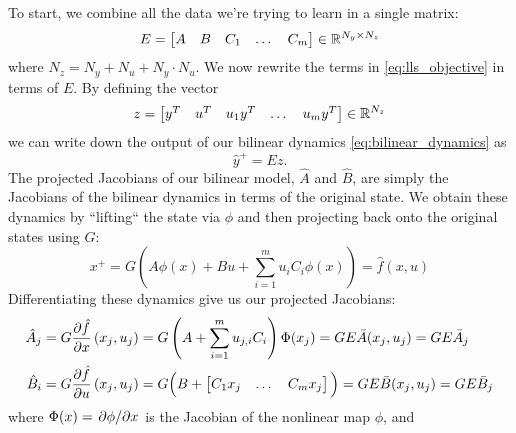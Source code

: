 \documentclass{article}
\begin{document}
  To start, we combine all the data we're trying to learn in a single matrix:
  \begin{equation}
      E = \begin{bmatrix} A & B & C_1 & \dots & C_m \end{bmatrix} \in \mathbb{R}^{N_y \times N_z} \\
  \end{equation}
  where $N_z = N_y + N_u + N_y \cdot N_u$.  We now rewrite the terms in
  \eqref{eq:lls_objective} in terms of $E$. By defining the vector 
  \begin{equation}
      z = \begin{bmatrix} y^T & u^T & u_1 y^T & \dots & u_m y^T \end{bmatrix} \in \mathbb{R}^{N_z} 
  \end{equation}
  we can write down 
  the output of our bilinear dynamics \eqref{eq:bilinear_dynamics} as 
  \begin{equation} \label{eq:bilinear_dynamics_z}
      \hat{y}^+ = E z.
  \end{equation}
  The projected Jacobians of our bilinear model, $\hat{A}$ and $\hat{B}$, are simply the Jacobians 
  of the bilinear dynamics in terms of the original state. We obtain these dynamics by ``lifting`` 
  the state via $\phi$ and then projecting back onto the original states using $G$:
  \begin{equation} \label{eq:projected_dynamics}
      x^+ = G \left( A \phi(x) + B u + \sum_{i=1}^m u_i C_i \phi(x) \right)  = \hat{f}(x,u) 
  \end{equation}
  Differentiating these dynamics give us our projected Jacobians:
  \begin{subequations} \label{eq:projected_jacobians}
  \begin{align}
      \hat{A}_j &= G \pdv{\hat{f}}{x}\left(x_j,u_j\right) 
                = G \left(A + \sum_{i=1}^m u_{j,i} C_i \right) \Phi(x_j)
                = G E \bar{A}(x_j,u_j) = G E \bar{A}_j \\
      \hat{B}_i &= G \pdv{\hat{f}}{u}\left(x_j,u_j\right) 
                = G \Big(B + \begin{bmatrix} C_1 x_j & \dots & C_m x_j \end{bmatrix} \Big)
                = G E \bar{B}(x_j,u_j) = G E \bar{B}_j
  \end{align}
  \end{subequations}
  where $\Phi(x) = \pdv*{\phi}{x}$ is the Jacobian of the nonlinear map $\phi$, and
\end{document}

